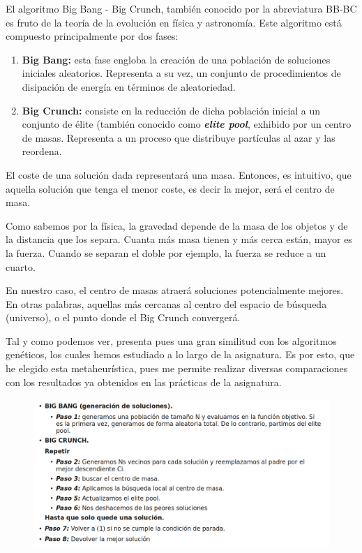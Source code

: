 \documentclass[10pt, a4paper]{article}
\theoremstyle{theorem-style}
\theoremstyle{theorem-style}
\theoremstyle{theorem2-style}
\theoremstyle{definition-style}
\theoremstyle{remark-style}
\theoremstyle{example-style}
\theoremstyle{definition-style}
\theoremstyle{remark-style}
\theoremstyle{remark-style}
\begin{document}
El algoritmo Big Bang - Big Crunch, también conocido por la abreviatura BB-BC es fruto de la teoría de la evolución en física y astronomía. Este algoritmo está compuesto principalmente por dos fases: 

\begin{enumerate}
\item \textbf{Big Bang:} esta fase engloba la creación de una población de soluciones iniciales aleatorios. Representa a su vez, un conjunto de procedimientos de disipación de energía en términos de aleatoriedad. 
\item \textbf{Big Crunch:} consiste en la reducción de dicha población inicial a un conjunto de élite (también conocido como \textbf{\textit{elite pool}}, exhibido por un centro de masas. Representa a un proceso que distribuye partículas al azar y las reordena. 
\end{enumerate}

El coste de una solución dada representará una masa. Entonces, es intuitivo, que aquella solución que tenga el menor coste, es decir la mejor, será el centro de masa. 

Como sabemos por la física, la gravedad depende de la masa de los objetos y de la distancia que los separa. Cuanta más masa tienen y más cerca están, mayor es la fuerza. Cuando se separan el doble por ejemplo, la fuerza se reduce a un cuarto.

En nuestro caso, el centro de masas atraerá soluciones potencialmente mejores. En otras palabras, aquellas más cercanas al centro del espacio de búsqueda (universo), o el punto donde el Big Crunch convergerá. 

Tal y como podemos ver, presenta pues una gran similitud con los algoritmos genéticos, los cuales hemos estudiado a lo largo de la asignatura. Es por esto, que he elegido esta metaheurística, pues me permite realizar diversas comparaciones con los resultados ya obtenidos en las prácticas de la asignatura. 

\pagebreak
\begin{figure}[htp]
\centering
\includegraphics[scale=0.350]{Imagenes/pseudo.png}
\label{}
\end{figure}
\end{document}
